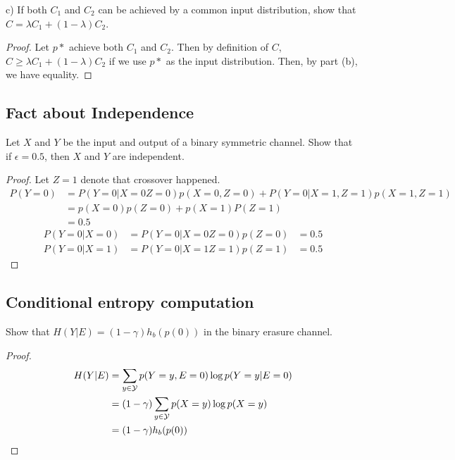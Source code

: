 \documentclass[../main.tex]{subfiles}
\begin{document}
c) If both $C_1$ and $C_2$ can be achieved by a common input distribution, show that $C=\lambda C_1 +(1-\lambda)C_2$.
\begin{proof}
    Let $p*$ achieve both $C_1$ and $C_2$. Then by definition of $C$, $C\geq \lambda C_1 + (1-\lambda)C_2$ if we use $p*$ as the input distribution. Then, by part (b), we have equality.
\end{proof}


\subsection*{Fact about Independence}
Let $X$ and $Y$ be the input and output of a binary symmetric channel. Show that if $\epsilon=0.5$, then $X$ and $Y$ are independent.
\begin{proof}
Let $Z=1$ denote that crossover happened. 
    \begin{align*}
        P(Y=0) &= P(Y=0|X=0 Z=0)p(X=0, Z=0) + P(Y=0|X=1, Z=1)p(X=1, Z=1) \\
        &= p(X=0)p(Z=0) + p(X=1) P(Z=1)\\
        &= 0.5 
    \end{align*}
    \begin{align*}
        P(Y=0|X=0) &= P(Y=0|X=0 Z=0)p(Z=0)
        &= 0.5 
    \end{align*}
    \begin{align*}
        P(Y=0|X=1) &= P(Y=0|X=1 Z=1)p(Z=1)
        &= 0.5 
    \end{align*}
\end{proof}
\subsection*{Conditional entropy computation}
Show that $H(Y|E)=(1-\gamma)h_b(p(0))$ in the binary erasure channel.
\begin{proof}
    \begin{align*}
        H(Y|E)&=\sum_{y\in\mathcal{Y}}p(Y=y, E=0)\log p(Y=y|E=0)\\
        &= (1-\gamma)\sum_{y\in\mathcal{Y}}p(X=y)\log p(X=y)\\
        &= (1-\gamma)h_b(p(0))
    \end{align*}
\end{proof}
\end{document}
